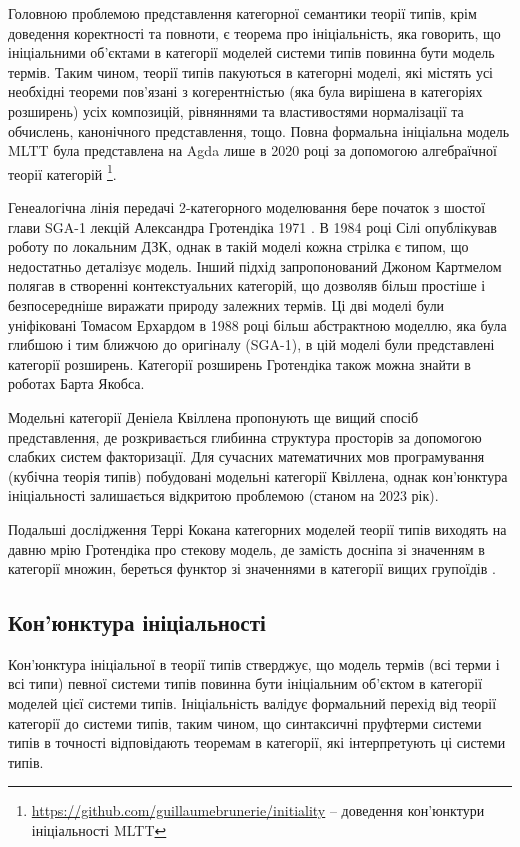 Головною проблемою представлення категорної семантики теорії типів, крім доведення коректності та повноти,
є теорема про ініціальність, яка говорить, що ініціальними об'єктами в категорії моделей системи типів повинна бути модель термів.
Таким чином, теорії типів пакуються в категорні моделі, які містять усі
необхідні теореми пов'язані з когерентністью (яка була вирішена в категоріях розширень\cite{Lumsdaine15}) усіх композицій, рівняннями та властивостями
нормалізації та обчислень, канонічного представлення, тощо. Повна формальна ініціальна модель MLTT була
представлена на Agda лише в 2020 році за допомогою алгебраїчної теорії
категорій \footnote{\url{https://github.com/guillaumebrunerie/initiality} -- доведення кон'юнктури ініціальності MLTT}.

Генеалогічна лінія передачі 2-категорного моделювання бере початок з шостої глави SGA-1 лекцій Александра Гротендіка 1971 \cite{SGA1}.
В 1984 році Сілі \cite{Seely84} опублікував роботу по локальним ДЗК, однак в такій моделі кожна
стрілка є типом, що недостатньо деталізує модель. Інший підхід запропонований Джоном Картмелом \cite{Cartmell86} полягав
в створенні контекстуальних категорій, що дозволяв більш простіше і безпосередніше виражати природу залежних термів.
Ці дві моделі були уніфіковані Томасом Ерхардом в 1988 році \cite{Ehrhard88} більш абстрактною моделлю,
яка була глибшою і тим ближчою до оригіналу (SGA-1), в цій моделі були представлені категорії розширень.
Категорії розширень Гротендіка також можна знайти в роботах Барта Якобса\cite{Jacobs93}\cite{Jacobs99}.

Модельні категорії Деніела Квіллена \cite{Quillen67} пропонують ще вищий спосіб представлення,
де розкривається глибинна структура просторів за допомогою слабких систем факторизації.
Для сучасних математичних мов програмування (кубічна теорія типів) побудовані модельні категорії Квіллена,
однак кон'юнктура ініціальності залишається відкритою проблемою (станом на 2023 рік).

Подальші дослідження Террі Кокана категорних моделей теорії типів виходять на давню мрію
Гротендіка про стекову модель, де замість досніпа зі значенням в категорії множин,
береться функтор зі значеннями в категорії вищих групоїдів \cite{Coquand17Stack}.

\subsection*{Кон'юнктура ініціальності}
Кон'юнктура ініціальної в теорії типів стверджує, що модель термів (всі терми і всі типи)
певної системи типів повинна бути ініціальним об'єктом в категорії моделей цієї
системи типів. Ініціальність валідує формальний перехід від теорії категорії до
системи типів, таким чином, що синтаксичні пруфтерми системи типів в точності
відповідають теоремам в категорії, які інтерпретують ці системи типів.

